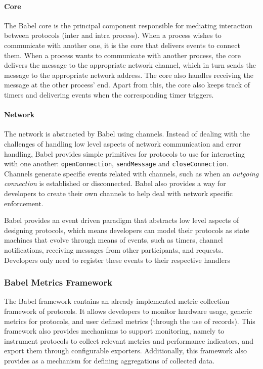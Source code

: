 \paragraph{Core} The Babel core is the principal component responsible for mediating interaction between protocols (inter and intra process). When a process wishes to communicate with another one, it is the core that delivers events to connect them. When a process wants to communicate with another process, the core delivers the message to the appropriate network channel, which in turn sends the message to the appropriate network address. The core also handles receiving the message at the other process' end. Apart from this, the core also keeps track of timers and delivering events when the corresponding timer triggers.

\paragraph{Network} The network is abstracted by Babel using channels. Instead of dealing with the challenges of handling low level aspects of network communication and error handling, Babel provides simple primitives for protocols to use for interacting with one another: \texttt{openConnection}, \texttt{sendMessage} and \texttt{closeConnection}. Channels generate specific events related with channels, such as when an \textit{outgoing connection} is established or disconnected. Babel also provides a way for developers to create their own channels to help deal with network specific enforcement.

Babel provides an event driven paradigm that abstracts low level aspects of designing protocols, which means developers can model their protocols as state machines that evolve through means of events, such as timers, channel notifications, receiving messages from other participants, and requests. Developers only need to register these events to their respective handlers

\subsubsection*{Babel Metrics Framework}
\label{sssec:babel_metrics_framework}
The Babel framework contains an already implemented metric collection framework of protocols\cite{Paulico2025}. It allows developers to monitor hardware usage, generic metrics for protocols, and user defined metrics (through the use of records). This framework also provides mechanisms to support monitoring, namely to instrument protocols to collect relevant metrics and performance indicators, and export them through configurable exporters. Additionally, this framework also provides as a mechanism for defining aggregations of collected data.

